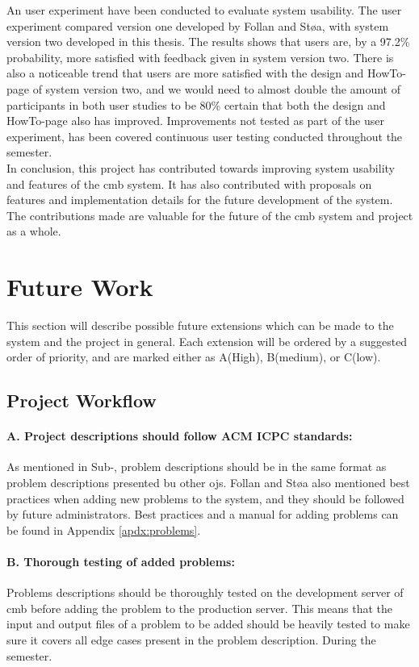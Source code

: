 An user experiment have been conducted to evaluate system usability. The user experiment compared version one developed by Follan and Støa, with system version two developed in this thesis. The results shows that users are, by a 97.2\% probability, more satisfied with feedback given in system version two. There is also a noticeable trend that users are more satisfied with the design and HowTo-page of system version two, and we would need to almost double the amount of participants in both user studies to be 80\% certain that both the design and HowTo-page also has improved. Improvements not tested as part of the user experiment, has been covered continuous user testing conducted throughout the semester. \\

In conclusion, this project has contributed towards improving system usability and features of the \gls{cmb} system. It has also contributed with proposals on features and implementation details for the future development of the system. The contributions made are valuable for the future of the \gls{cmb} system and project as a whole.


\section{Future Work}
\label{sec:future-work}
This section will describe possible future extensions which can be made to the system and the project in general. Each extension will be ordered by a suggested order of priority, and are marked either as A(High), B(medium), or C(low).

\subsection*{Project Workflow}

\paragraph*{A. Project descriptions should follow ACM ICPC standards:} As mentioned in Sub-, problem descriptions should be in the same format as problem descriptions presented bu other \glspl{oj}. Follan and Støa also mentioned best practices when adding new problems to the system, and they should be followed by future administrators. Best practices and a manual for adding problems can be found in Appendix \ref{apdx:problems}.

\paragraph*{B. Thorough testing of added problems:} Problems descriptions should be thoroughly tested on the development server of \gls{cmb} before adding the problem to the production server. This means that the input and output files of a problem to be added should be heavily tested to make sure it covers all edge cases present in the problem description. During the semester.

